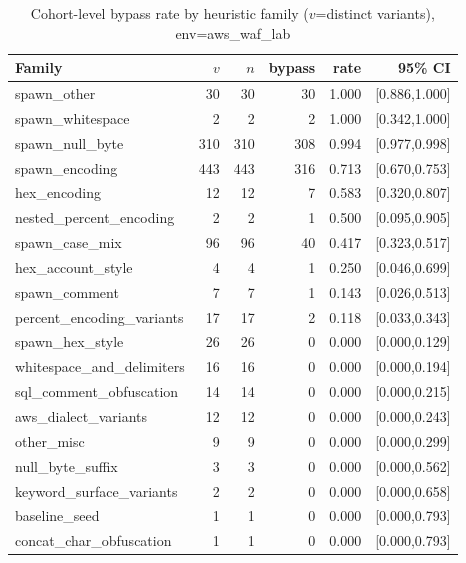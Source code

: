 \begin{table}[t]
\centering
\small
\caption{Cohort-level bypass rate by heuristic family ($v$=distinct variants), env=aws_waf_lab}
\label{tab:probe-family-rates}
\begin{tabular}{lrrrrr}
\hline
Family & $v$ & $n$ & bypass & rate & 95\% CI \\
\hline
spawn\_other & 30 & 30 & 30 & 1.000 & [0.886,1.000] \\
spawn\_whitespace & 2 & 2 & 2 & 1.000 & [0.342,1.000] \\
spawn\_null\_byte & 310 & 310 & 308 & 0.994 & [0.977,0.998] \\
spawn\_encoding & 443 & 443 & 316 & 0.713 & [0.670,0.753] \\
hex\_encoding & 12 & 12 & 7 & 0.583 & [0.320,0.807] \\
nested\_percent\_encoding & 2 & 2 & 1 & 0.500 & [0.095,0.905] \\
spawn\_case\_mix & 96 & 96 & 40 & 0.417 & [0.323,0.517] \\
hex\_account\_style & 4 & 4 & 1 & 0.250 & [0.046,0.699] \\
spawn\_comment & 7 & 7 & 1 & 0.143 & [0.026,0.513] \\
percent\_encoding\_variants & 17 & 17 & 2 & 0.118 & [0.033,0.343] \\
spawn\_hex\_style & 26 & 26 & 0 & 0.000 & [0.000,0.129] \\
whitespace\_and\_delimiters & 16 & 16 & 0 & 0.000 & [0.000,0.194] \\
sql\_comment\_obfuscation & 14 & 14 & 0 & 0.000 & [0.000,0.215] \\
aws\_dialect\_variants & 12 & 12 & 0 & 0.000 & [0.000,0.243] \\
other\_misc & 9 & 9 & 0 & 0.000 & [0.000,0.299] \\
null\_byte\_suffix & 3 & 3 & 0 & 0.000 & [0.000,0.562] \\
keyword\_surface\_variants & 2 & 2 & 0 & 0.000 & [0.000,0.658] \\
baseline\_seed & 1 & 1 & 0 & 0.000 & [0.000,0.793] \\
concat\_char\_obfuscation & 1 & 1 & 0 & 0.000 & [0.000,0.793] \\
\hline
\end{tabular}
\end{table}
